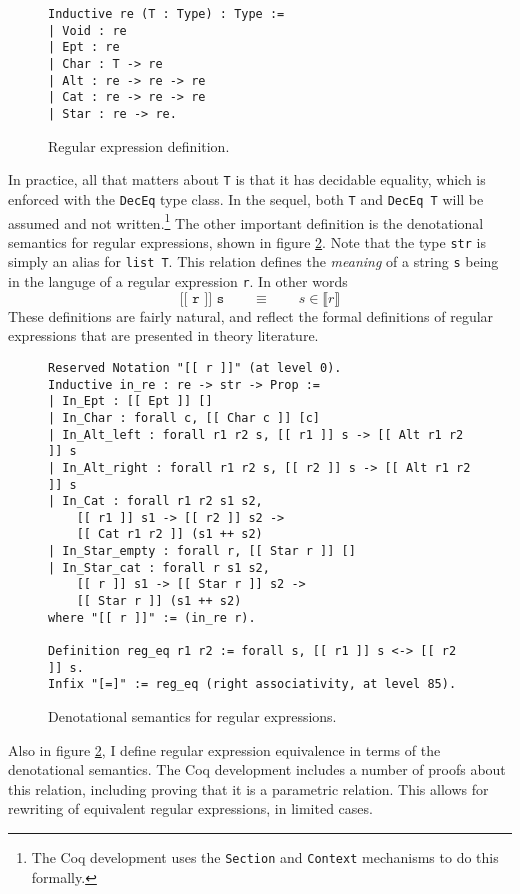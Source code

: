\documentclass{article}
\newcommand{\coq}[1]{\texttt{#1}}
\begin{document}
\begin{figure}
  \centering
\begin{verbatim}
Inductive re (T : Type) : Type :=
| Void : re
| Ept : re
| Char : T -> re
| Alt : re -> re -> re
| Cat : re -> re -> re
| Star : re -> re.
\end{verbatim}
\caption{Regular expression definition.}
\label{fig:re}
\end{figure}
 In practice, all that matters about \coq{T} is that it has decidable equality,
which is enforced with the \coq{DecEq} type class. In the sequel, both \coq{T}
and \coq{DecEq T} will be assumed and not written.\footnote{The Coq development
uses the \coq{Section} and \coq{Context} mechanisms to do this formally.} The
other important definition is the denotational semantics for regular
expressions, shown in figure \ref{fig:in_re}. Note that the type \coq{str} is
simply an alias for \coq{list T}. This relation defines the \emph{meaning} of a
string \coq{s} being in the languge of a regular expression \coq{r}. In other
words
$$ \coq{[[ r ]] s} \qquad \equiv \qquad s \in \llbracket r \rrbracket $$
These definitions are fairly natural, and reflect the formal definitions of
regular expressions that are presented in theory literature.

\begin{figure}
  \centering
\begin{verbatim}
Reserved Notation "[[ r ]]" (at level 0).
Inductive in_re : re -> str -> Prop :=
| In_Ept : [[ Ept ]] []
| In_Char : forall c, [[ Char c ]] [c]
| In_Alt_left : forall r1 r2 s, [[ r1 ]] s -> [[ Alt r1 r2 ]] s
| In_Alt_right : forall r1 r2 s, [[ r2 ]] s -> [[ Alt r1 r2 ]] s
| In_Cat : forall r1 r2 s1 s2,
    [[ r1 ]] s1 -> [[ r2 ]] s2 ->
    [[ Cat r1 r2 ]] (s1 ++ s2)
| In_Star_empty : forall r, [[ Star r ]] []
| In_Star_cat : forall r s1 s2,
    [[ r ]] s1 -> [[ Star r ]] s2 ->
    [[ Star r ]] (s1 ++ s2)
where "[[ r ]]" := (in_re r).

Definition reg_eq r1 r2 := forall s, [[ r1 ]] s <-> [[ r2 ]] s.
Infix "[=]" := reg_eq (right associativity, at level 85).
\end{verbatim}
\caption{Denotational semantics for regular expressions.}
\label{fig:in_re}
\end{figure}

Also in figure \ref{fig:in_re}, I define regular expression equivalence in
terms of the denotational semantics. The Coq development includes a number of
proofs about this relation, including proving that it is a parametric relation.
This allows for rewriting of equivalent regular expressions, in limited cases.
\end{document}
